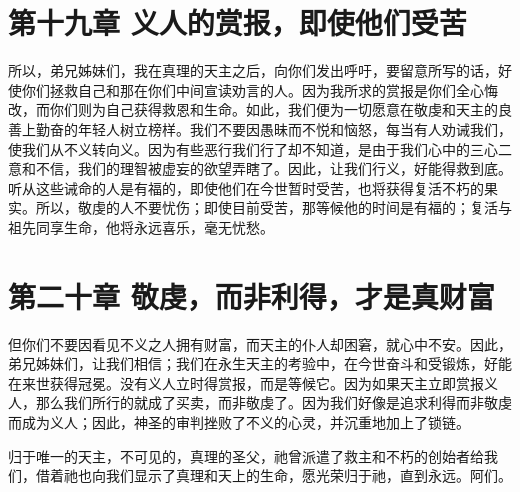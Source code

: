 
\section{第十九章 义人的赏报，即使他们受苦}

所以，弟兄姊妹们，我在真理的天主之后，向你们发出呼吁，要留意所写的话，好使你们拯救自己和那在你们中间宣读劝言的人。因为我所求的赏报是你们全心悔改，而你们则为自己获得救恩和生命。如此，我们便为一切愿意在敬虔和天主的良善上勤奋的年轻人树立榜样。我们不要因愚昧而不悦和恼怒，每当有人劝诫我们，使我们从不义转向义。因为有些恶行我们行了却不知道，是由于我们心中的三心二意和不信，我们的理智被虚妄的欲望弄瞎了。因此，让我们行义，好能得救到底。听从这些诫命的人是有福的，即使他们在今世暂时受苦，也将获得复活不朽的果实。所以，敬虔的人不要忧伤；即使目前受苦，那等候他的时间是有福的；复活与祖先同享生命，他将永远喜乐，毫无忧愁。\par


\section{第二十章 敬虔，而非利得，才是真财富}

但你们不要因看见不义之人拥有财富，而天主的仆人却困窘，就心中不安。因此，弟兄姊妹们，让我们相信；我们在永生天主的考验中，在今世奋斗和受锻炼，好能在来世获得冠冕。没有义人立时得赏报，而是等候它。因为如果天主立即赏报义人，那么我们所行的就成了买卖，而非敬虔了。因为我们好像是追求利得而非敬虔而成为义人；因此，神圣的审判挫败了不义的心灵，并沉重地加上了锁链。\par

归于唯一的天主，不可见的，真理的圣父，祂曾派遣了救主和不朽的创始者给我们，借着祂也向我们显示了真理和天上的生命，愿光荣归于祂，直到永远。阿们。\par

